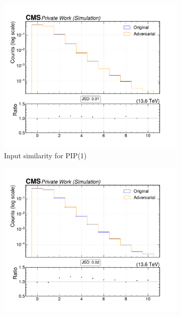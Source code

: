 \begin{figure}[htbp]
  \centering
  \begin{subfigure}[t]{0.32\textwidth}
    \includegraphics[width=\linewidth]{media/output/features/compare/intprob_1/cmp_global_features_nsv.pdf}
    \caption{Input similarity for PIP(1)}
  \end{subfigure}\hfill
  \begin{subfigure}[t]{0.32\textwidth}
    \includegraphics[width=\linewidth]{media/output/features/compare/intprob_2/cmp_global_features_nsv.pdf}

\end{subfigure}
\end{figure}
